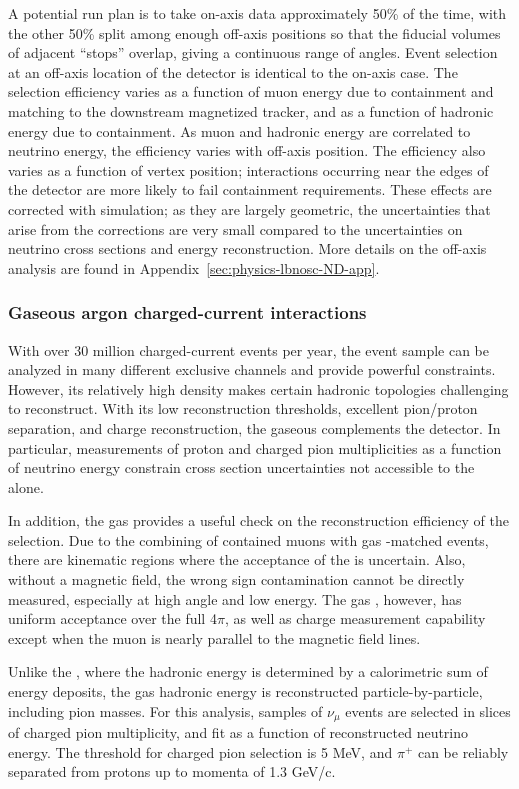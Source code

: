 A potential run plan is to take on-axis data approximately 50\% of the time, with the other 50\% split among enough off-axis positions so that the fiducial volumes of adjacent ``stops'' overlap, giving a continuous range of angles. Event selection at an off-axis location of the  detector is identical to the on-axis case. The selection efficiency varies as a function of muon energy due to containment and matching to the downstream magnetized tracker, and as a function of hadronic energy due to containment. As muon and hadronic energy are correlated to neutrino energy, the efficiency varies with off-axis position. The efficiency also varies as a function of vertex position; interactions occurring near the edges of the detector are more likely to fail containment requirements. These effects are corrected with simulation; as they are largely geometric, the uncertainties that arise from the corrections are very small compared to the uncertainties on neutrino cross sections and energy reconstruction. More details on the off-axis analysis are found in Appendix~\ref{sec:physics-lbnosc-ND-app}.

\subsubsection{Gaseous argon charged-current interactions}

With over 30 million charged-current events per year, the  event sample can be analyzed in many different exclusive channels and provide powerful constraints. However, its relatively high density makes certain hadronic topologies challenging to reconstruct. With its low reconstruction thresholds, excellent pion/proton separation, and charge reconstruction, the gaseous  complements the  detector. In particular, measurements of proton and charged pion multiplicities as a function of neutrino energy constrain cross section uncertainties not accessible to the  alone.

In addition, the gas  provides a useful check on the reconstruction efficiency of the  selection. Due to the combining of contained muons with gas -matched events, there are kinematic regions where the acceptance of the  is uncertain. Also, without a magnetic field, the wrong sign contamination cannot be directly measured, especially at high angle and low energy. The gas , however, has uniform acceptance over the full 4$\pi$, as well as charge measurement capability except when the muon is nearly parallel to the magnetic field lines.

Unlike the , where the hadronic energy is determined by a calorimetric sum of energy deposits, the gas  hadronic energy is reconstructed particle-by-particle, including pion masses. For this analysis, samples of $\nu_{\mu}$  events are selected in slices of charged pion multiplicity, and fit as a function of reconstructed neutrino energy. The threshold for charged pion selection is 5 MeV, and $\pi^{+}$ can be reliably separated from protons up to momenta of 1.3 GeV/c.

